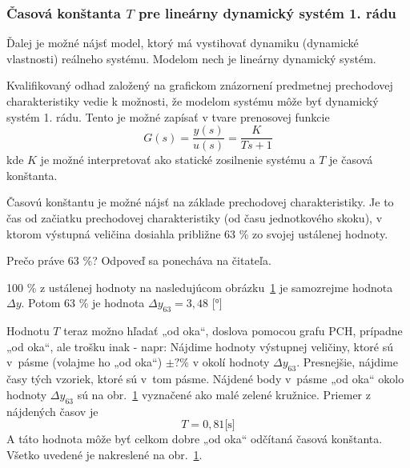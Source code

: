 \documentclass[a4paper, 10pt, ]{article}
\begin{document}
\subsubsection[Časová konštanta $T$ pre lineárny dynamický systém 1. rádu]{Časová konštanta $T$ pre lineárny dynamický systém 1. rádu}


Ďalej je možné nájsť model, ktorý má vystihovať dynamiku (dynamické vlastnosti) reálneho systému. Modelom nech je lineárny dynamický systém.

Kvalifikovaný odhad založený na grafickom znázornení predmetnej prechodovej charakteristiky vedie k možnosti, že modelom systému môže byť dynamický systém 1. rádu. Tento je možné zapísať v tvare prenosovej funkcie
\begin{equation}
    G(s) = \frac{y(s)}{u(s)} = \frac{K}{Ts+1}
\end{equation}
kde $K$ je možné interpretovať ako statické zosilnenie systému a $T$ je časová konštanta.

Časovú konštantu je možné nájsť na základe prechodovej charakteristiky. Je to čas od začiatku prechodovej charakteristiky (od času jednotkového skoku), v ktorom výstupná veličina dosiahla približne 63 \% zo svojej ustálenej hodnoty.

Prečo práve 63 \%? Odpoveď sa ponecháva na čitateľa.

100 \% z ustálenej hodnoty na nasledujúcom obrázku~\ref{graf30} je samozrejme hodnota $\Delta y$. Potom 63 \% je hodnota $\Delta y_{63} =  3,48$ [°]



\begin{figure}[t]
	\centering


    \vspace{-4mm}

	\caption{}
	\label{graf30}

\end{figure}

Hodnotu $T$ teraz možno hľadať „od oka“, doslova pomocou grafu PCH, prípadne „od oka“, ale trošku inak - napr: Nájdime hodnoty výstupnej veličiny, ktoré sú v~pásme (volajme ho „od oka“) $\pm ? \%$ v okolí hodnoty $\Delta y_{63}$. Presnejšie, nájdime časy tých vzoriek, ktoré sú v~tom pásme. Nájdené body v~pásme „od oka“ okolo hodnoty $\Delta y_{63}$ sú na obr.~\ref{graf30} vyznačené ako malé zelené kružnice. Priemer z nájdených časov je
\begin{equation}
    T =  0,81 \text{[s]}
\end{equation}
A táto hodnota môže byť celkom dobre „od oka“ odčítaná časová konštanta. Všetko uvedené je nakreslené na obr.~\ref{graf30}.
\end{document}
